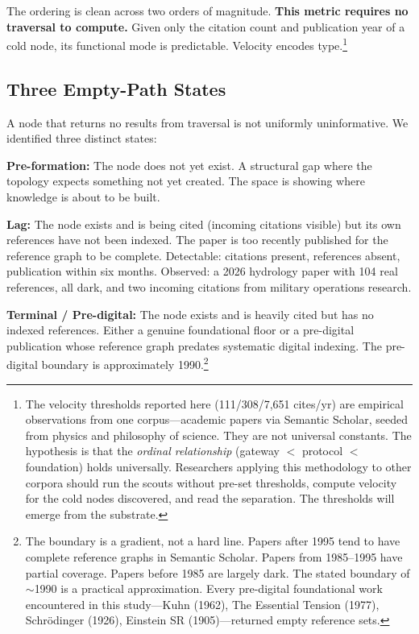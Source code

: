 \documentclass[11pt]{article}
\begin{document}
The ordering is clean across two orders of magnitude. \textbf{This metric requires no traversal to compute.} Given only the citation count and publication year of a cold node, its functional mode is predictable. Velocity encodes type.\footnote{\label{fn:corpus}The velocity thresholds reported here (111/308/7,651 cites/yr) are empirical observations from one corpus---academic papers via Semantic Scholar, seeded from physics and philosophy of science. They are not universal constants. The hypothesis is that the \textit{ordinal relationship} (gateway $<$ protocol $<$ foundation) holds universally. Researchers applying this methodology to other corpora should run the scouts without pre-set thresholds, compute velocity for the cold nodes discovered, and read the separation. The thresholds will emerge from the substrate.}

\subsection{Three Empty-Path States}

A node that returns no results from traversal is not uniformly uninformative. We identified three distinct states:

\textbf{Pre-formation:} The node does not yet exist. A structural gap where the topology expects something not yet created. The space is showing where knowledge is about to be built.

\textbf{Lag:} The node exists and is being cited (incoming citations visible) but its own references have not been indexed. The paper is too recently published for the reference graph to be complete. Detectable: citations present, references absent, publication within six months. Observed: a 2026 hydrology paper with 104 real references, all dark, and two incoming citations from military operations research.

\textbf{Terminal / Pre-digital:} The node exists and is heavily cited but has no indexed references. Either a genuine foundational floor or a pre-digital publication whose reference graph predates systematic digital indexing. The pre-digital boundary is approximately 1990.\footnote{\label{fn:predigital}The boundary is a gradient, not a hard line. Papers after 1995 tend to have complete reference graphs in Semantic Scholar. Papers from 1985--1995 have partial coverage. Papers before 1985 are largely dark. The stated boundary of $\sim$1990 is a practical approximation. Every pre-digital foundational work encountered in this study---Kuhn (1962), The Essential Tension (1977), Schr\"{o}dinger (1926), Einstein SR (1905)---returned empty reference sets.}
\end{document}
